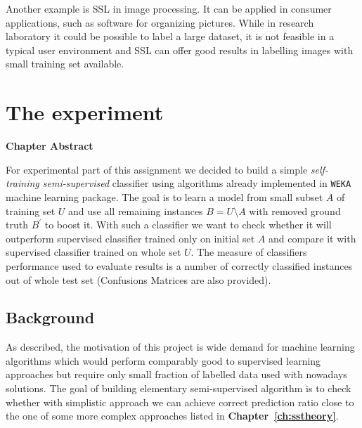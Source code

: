 \documentclass[12pt, a4paper, pdflatex]{report}
\newenvironment{chapabstract}
{
	\vspace{0.5cm}
	\small
	\begin{center}
    \bfseries Chapter Abstract
    \end{center}
}{\vspace{1.5cm}}
\begin{document}
Another example is SSL in image processing. It can be applied in consumer applications, such as software for organizing pictures. While in research laboratory it could be possible to label a large dataset, it is not feasible in a typical user environment and SSL can offer good results in labelling images with small training set available\cite{Guillaumin10}.


\chapter{The experiment}

\begin{chapabstract}
For experimental part of this assignment we decided to build a simple \emph{self-training semi-supervised} classifier using algorithms already implemented in \texttt{WEKA} machine learning package. The goal is to learn a model from small subset $A$ of training set $U$ and use all remaining instances $B = U \setminus A$ with removed ground truth $B^{\prime}$ to boost it. With such a classifier we want to check whether it will outperform supervised classifier trained only on initial set $A$ and compare it with supervised classifier trained on whole set $U$. The measure of classifiers performance used to evaluate results is a number of correctly classified instances out of whole test set (Confusions Matrices are also provided).
\end{chapabstract}

\section{Background}
As described, the motivation of this project is wide demand for machine learning algorithms which would perform comparably good to supervised learning approaches but require only small fraction of labelled data used with nowadays solutions. The goal of building elementary semi-supervised algorithm is to check whether with simplistic approach we can achieve correct prediction ratio close to the one of some more complex approaches listed in \textbf{Chapter~\ref{ch:sstheory}}. 
\end{document}
